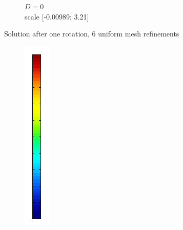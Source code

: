 \documentclass[mathserif]{beamer}
\begin{document}
\begin{frame}
\begin{figure}[H]
\begin{subfigure}[H]{0.3\textwidth}
		\vspace{-3mm}
		\caption{$D = 0$\\\vspace{-2mm}scale [-0.00989; 3.21]}
	\end{subfigure}
	\vspace{-3mm}
	\caption{Solution after one rotation, 6 uniform mesh refinements}	
\end{figure}
\vspace{-8mm}
\begin{figure}[H]
\centering
	\begin{subfigure}[H]{0.02\textwidth}
		\includegraphics[width=\textwidth]{images/timedep-multiscale/stability/scale.jpg}

\end{subfigure}
\end{figure}
\end{frame}
\end{document}
